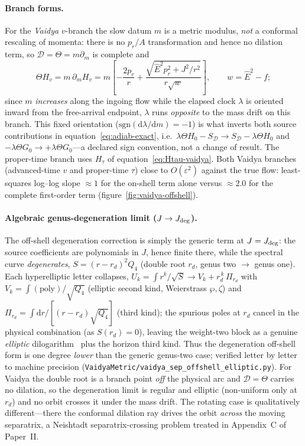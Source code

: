 \documentclass[12pt]{iopart}
\newcommand{\Ehat}{\hat E}
\newcommand{\Jc}{J_{\rm deg}}
\newcommand{\dd}{\mathrm{d}}
\begin{document}
\paragraph{Branch forms.} For the \emph{Vaidya} $v$-branch the slow datum $m$ is a metric
modulus, \emph{not} a conformal rescaling of momenta: there is no $p_r/A$ transformation
and hence no dilation term, so $\mathcal D=\Theta=m\partial_m$ is complete and
\begin{equation}
    \Theta H_v=m\,\partial_m H_v
    =m\!\left[-\frac{2p_r}{r}+\frac{\sqrt{\Ehat^2p_r^2+J^2/r^2}}{r\sqrt w}\right],
    \qquad w=\Ehat^2-f;
    \label{eq:ThetaHv}
\end{equation}
since $m$ \emph{increases} along the ingoing flow while the elapsed clock $\lambda$ is
oriented inward from the free-arrival endpoint, $\lambda$ runs \emph{opposite} to the mass
drift on this branch. This fixed orientation ($\mathrm{sgn}(\dd\lambda/\dd m)=-1$) is what
inverts both source contributions in equation~\eqref{eq:adiab-exact}, i.e.\
$\lambda\Theta H_0-S_{\mathcal D}\to S_{\mathcal D}-\lambda\Theta H_0$ and
$-\lambda\Theta G_0\to+\lambda\Theta G_0$---a declared sign convention, not a change of
result. The proper-time branch uses $H_\tau$ of equation~\eqref{eq:Htau-vaidya}. Both Vaidya branches (advanced-time $v$ and proper-time
$\tau$) close to $O(\varepsilon^2)$ against the true flow: least-squares log--log slope
$\approx1$ for the on-shell term alone versus $\approx2.0$ for the complete first-order
term (figure~\ref{fig:vaidya-offshell}).

\paragraph{Algebraic genus-degeneration limit ($J\to\Jc$).} The off-shell degeneration correction is simply
the generic term at $J=\Jc$: the source coefficients are polynomials in $J$, hence finite
there, while the spectral curve \emph{degenerates}, $S=(r-r_d)^2Q_4$ (double root $r_d$,
genus two $\to$ genus one). Each hyperelliptic letter collapses,
$U_k=\int r^k/\sqrt S\to V_k+r_d^{\,k}\,\Pi_{r_d}$ with $V_k=\int(\text{poly})/\sqrt{Q_4}$
(elliptic second kind, Weierstrass $\wp,\zeta$) and $\Pi_{r_d}=\int\dd r/[(r-r_d)\sqrt{Q_4}]$
(third kind); the spurious poles at $r_d$ cancel in the physical combination (as
$S(r_d)=0$), leaving the weight-two block as a genuine \emph{elliptic}
dilogarithm~\cite{BeilinsonLevin1994,BrownLevin2011} plus the horizon third kind. Thus the
degeneration off-shell form is one degree \emph{lower} than the generic genus-two case;
verified letter by letter to machine precision
(\texttt{VaidyaMetric/vaidya\_sep\_offshell\_elliptic.py}). For Vaidya the double root is a
branch point \emph{off} the physical arc and $\mathcal D=\Theta$ carries no dilation, so
the degeneration limit is regular and elliptic (non-uniform only at $r_d$) and no
orbit crosses it under the mass drift. The rotating case is qualitatively
different---there the conformal dilation ray drives the orbit \emph{across} the moving
separatrix, a Neishtadt separatrix-crossing problem
\cite{Neishtadt1987,Neishtadt2013} treated in Appendix~C of Paper~II.
\end{document}
